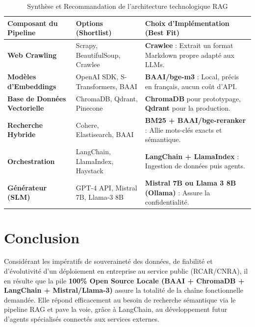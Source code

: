 \documentclass[12pt,a4paper]{article}
\begin{document}
\begin{table}[H]
    \centering
    \renewcommand{\arraystretch}{1.5}
    \begin{tabularx}{\textwidth}{|p{4.5cm}|X|p{6cm}|}
        \hline
        \textbf{Composant du Pipeline} & \textbf{Options (Shortlist)} & \textbf{Choix d'Implémentation (Best Fit)} \\
        \hline
        \textbf{Web Crawling} & Scrapy, BeautifulSoup, Crawlee & \textbf{Crawlee} : Extrait un format Markdown propre adapté aux LLMs. \\
        \hline
        \textbf{Modèles d'Embeddings} & OpenAI SDK, S-Transformers, BAAI & \textbf{BAAI/bge-m3} : Local, précis en français, aucun coût d'API. \\
        \hline
        \textbf{Base de Données Vectorielle} & ChromaDB, Qdrant, Pinecone & \textbf{ChromaDB} pour prototypage, \textbf{Qdrant} pour la production. \\
        \hline
        \textbf{Recherche Hybride} & Cohere, Elastisearch, BAAI & \textbf{BM25 + BAAI/bge-reranker} : Allie mots-clés exacts et sémantique. \\
        \hline
        \textbf{Orchestration} & LangChain, LlamaIndex, Haystack & \textbf{LangChain + LlamaIndex} : Ingestion de données puis agents. \\
        \hline
        \textbf{Générateur (SLM)} & GPT-4 API, Mistral 7B, Llama-3 8B & \textbf{Mistral 7B ou Llama 3 8B (Ollama)} : Assure la confidentialité. \\
        \hline
    \end{tabularx}
    \caption{Synthèse et Recommandation de l'architecture technologique RAG}
    \label{tab:comparaison_rag_synthese}
\end{table}

\vspace{0.5cm}
\section{Conclusion}
Considérant les impératifs de souveraineté des données, de fiabilité et d'évolutivité d'un déploiement en entreprise au service public (RCAR/CNRA), il en résulte que la pile \textbf{100\% Open Source Locale (BAAI + ChromaDB + LangChain + Mistral/Llama-3)} assure la totalité de la chaîne fonctionnelle demandée. Elle répond efficacement au besoin de recherche sémantique via le pipeline RAG et pave la voie, grâce à LangChain, au développement futur d'agents spécialisés connectés aux services externes.
\end{document}
